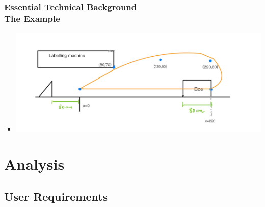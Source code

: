 \documentclass[ucs,10pt]{beamer}
\begin{document}
\begin{frame}
\frametitle{Essential Technical Background \\
	\small \color{rwth-blue} The Example}
	\begin{itemize}
        \item \includegraphics[width=\linewidth]{./Used_Picture/Example_1.jpg}
	\end{itemize}
\end{frame}



\section{Analysis}

\subsection{User Requirements}
\end{document}
